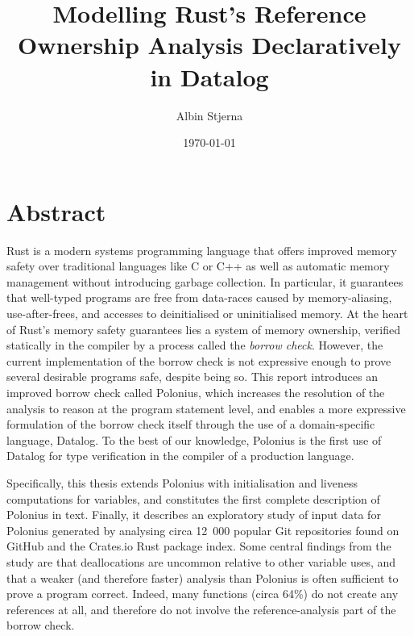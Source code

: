 \documentclass[11pt,a4paper,twoside,openany]{report}
\author{Albin Stjerna}
\date{\today}
\title{Modelling Rust's Reference Ownership Analysis Declaratively in Datalog}
\renewcommand\_{\textunderscore\allowbreak}
\begin{document}


\maketitle

\section*{Abstract}

Rust is a modern systems programming language that offers improved memory safety
over traditional languages like C or C++ as well as automatic memory management
without introducing garbage collection. In particular, it guarantees that
well-typed programs are free from data-races caused by memory-aliasing,
use-after-frees, and accesses to deinitialised or uninitialised memory. At the
heart of Rust's memory safety guarantees lies a system of memory ownership,
verified statically in the compiler by a process called the \textit{borrow
  check}. However, the current implementation of the borrow check is not
expressive enough to prove several desirable programs safe, despite being so.
This report introduces an improved borrow check called Polonius, which increases
the resolution of the analysis to reason at the program statement level, and
enables a more expressive formulation of the borrow check itself through the use
of a domain-specific language, Datalog. To the best of our knowledge, Polonius
is the first use of Datalog for type verification in the compiler of a
production language.

Specifically, this thesis extends Polonius with initialisation and liveness
computations for variables, and constitutes the first complete description of
Polonius in text. Finally, it describes an exploratory study of input
data for Polonius generated by analysing circa 12~000 popular Git repositories
found on GitHub and the Crates.io Rust package index. Some central findings from
the study are that deallocations are uncommon relative to other variable uses,
and that a weaker (and therefore faster) analysis than Polonius is often
sufficient to prove a program correct. Indeed, many functions (circa 64\%) do
not create any references at all, and therefore do not involve the
reference-analysis part of the borrow check.
\end{document}
